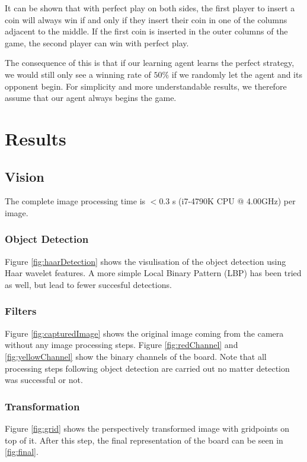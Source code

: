 \documentclass[10pt,twocolumn,letterpaper]{article}
\begin{document}
It can be shown that with perfect play on both sides, the first player to insert a coin will always win if and only if they insert their coin in one of the columns adjacent to the middle.
If the first coin is inserted in the outer columns of the game, the second player can win with perfect play.

The consequence of this is that if our learning agent learns the perfect strategy, we would still only see a winning rate of $50\%$ if we randomly
let the agent and its opponent begin.
For simplicity and more understandable results, we therefore assume that our agent always begins the game.

\section{Results}

\subsection{Vision}
The complete image processing time is $< 0.3$ s (i7-4790K CPU @ 4.00GHz) per image.

\subsubsection{Object Detection}
Figure \ref{fig:haarDetection} shows the visulisation of the object detection using Haar wavelet features.
A more simple Local Binary Pattern (LBP) has been tried as well, but lead to fewer succesful detections.

\subsubsection{Filters}
Figure \ref{fig:capturedImage} shows the original image coming from the camera without any image processing steps.
Figure \ref{fig:redChannel} and \ref{fig:yellowChannel} show the binary channels of the board.
Note that all processing steps following object detection are carried out no matter detection was successful or not.
\subsubsection{Transformation}
Figure \ref{fig:grid} shows the perspectively transformed image with gridpoints on top of it.
After this step, the final representation of the board can be seen in \ref{fig:final}.
\end{document}
